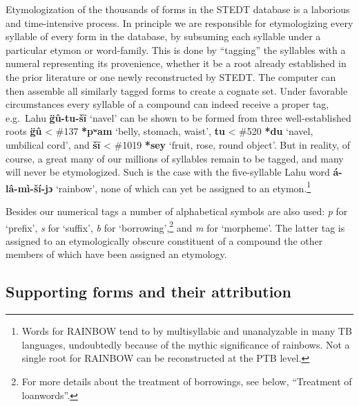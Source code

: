 Etymologization of the thousands of forms in the STEDT database is a laborious and time-intensive process. In principle we are responsible for etymologizing every syllable of every form in the database, by subsuming each syllable under a particular etymon or word-family. This is done by “tagging” the syllables with a numeral representing its provenience, whether it be a root already established in the prior literature or one newly reconstructed by STEDT. The computer can then assemble all similarly tagged forms to create a cognate set. Under favorable circumstances every syllable of a compound can indeed receive a proper tag, e.g.\ Lahu \textbf{g̈û-tu-šī} ‘navel’ can be shown to be formed from three well-established roots \textbf{g̈û} < \#137 \textbf{*pʷam} ‘belly, stomach, waist’, \textbf{tu} < \#520 \textbf{*du} ‘navel, umbilical cord’, and \textbf{šī} < \#1019 \textbf{*sey} ‘fruit, rose, round object’. But in reality, of course, a great many of our millions of syllables remain to be tagged, and many will never be etymologized. Such is the case with the five-syllable Lahu word \textbf{á-lâ-mì-ší-jɔ} ‘rainbow’, none of which can yet be assigned to an etymon.\footnote{Words for RAINBOW tend to by multisyllabic and unanalyzable in many TB languages, undoubtedly because of the mythic significance of rainbows. Not a single root for RAINBOW can be reconstructed at the PTB level.}

Besides our numerical tags a number of alphabetical symbols are also used: \textit{p} for ‘prefix’, \textit{s} for ‘suffix’, \textit{b} for ‘borrowing’,\footnote{For more details about the treatment of borrowings, see below, “Treatment of loanwords”.} and \textit{m} for ‘morpheme’. The latter tag is assigned to an etymologically obscure constituent of a compound the other members of which have been assigned an etymology.

\subsection{Supporting forms and their attribution}

